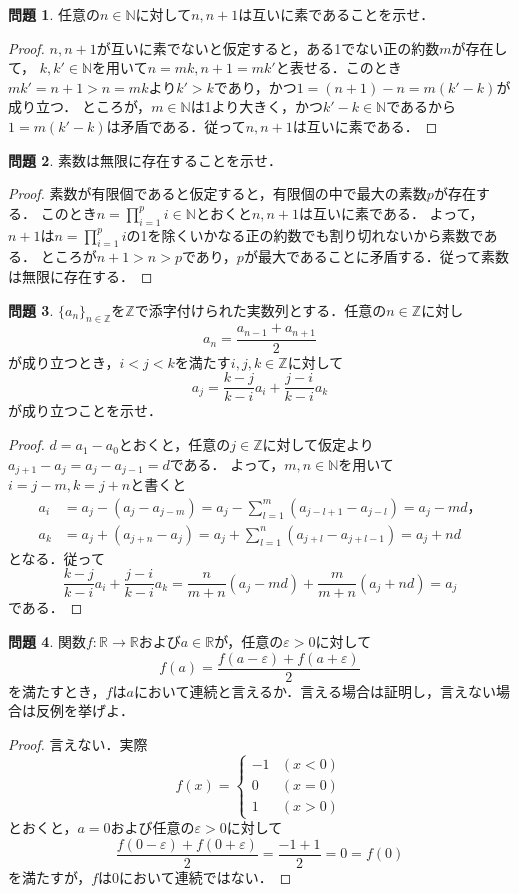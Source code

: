 \documentclass{jsarticle}
\theoremstyle{definition}
\newtheorem{qst}{問題}
\begin{document}
\begin{qst}
任意の$n\in\mathbb{N}$に対して$n,n+1$は互いに素であることを示せ．
\end{qst}
\begin{proof}
$n,n+1$が互いに素でないと仮定すると，ある1でない正の約数$m$が存在して，
$k,k'\in\mathbb{N}$を用いて$n=mk,n+1=mk'$と表せる．このとき
$mk'=n+1>n=mk$より$k'>k$であり，かつ$1=(n+1)-n=m(k'-k)$が成り立つ．
ところが，$m\in\mathbb{N}$は1より大きく，かつ$k'-k\in\mathbb{N}$であるから
$1=m(k'-k)$は矛盾である．従って$n,n+1$は互いに素である．
\end{proof}

\begin{qst}
素数は無限に存在することを示せ．
\end{qst}
\begin{proof}
素数が有限個であると仮定すると，有限個の中で最大の素数$p$が存在する．
このとき$n=\prod_{i=1}^pi\in\mathbb{N}$とおくと$n,n+1$は互いに素である．
よって，$n+1$は$n=\prod_{i=1}^pi$の1を除くいかなる正の約数でも割り切れないから素数である．
ところが$n+1>n>p$であり，$p$が最大であることに矛盾する．従って素数は無限に存在する．
\end{proof}

\begin{qst}
$\{a_n\}_{n\in\mathbb{Z}}$を$\mathbb{Z}$で添字付けられた実数列とする．任意の$n\in\mathbb{Z}$に対し
\[ a_n=\frac{a_{n-1}+a_{n+1}}{2} \]
が成り立つとき，$i<j<k$を満たす$i,j,k\in\mathbb{Z}$に対して
\[ a_j=\frac{k-j}{k-i}a_i+\frac{j-i}{k-i}a_k \]
が成り立つことを示せ．
\end{qst}
\begin{proof}
$d=a_1-a_0$とおくと，任意の$j\in\mathbb{Z}$に対して仮定より$a_{j+1}-a_j=a_j-a_{j-1}=d$である．
よって，$m,n\in\mathbb{N}$を用いて$i=j-m,k=j+n$と書くと
\begin{align*}
a_i&=a_j-(a_j-a_{j-m})=a_j-\sum_{l=1}^m(a_{j-l+1}-a_{j-l})=a_j-md，\\
a_k&=a_j+(a_{j+n}-a_j)=a_j+\sum_{l=1}^n(a_{j+l}-a_{j+l-1})=a_j+nd
\end{align*}
となる．従って
\[
\frac{k-j}{k-i}a_i+\frac{j-i}{k-i}a_k=\frac{n}{m+n}(a_j-md)+\frac{m}{m+n}(a_j+nd)=a_j
\]
である．
\end{proof}

\begin{qst}
関数$f\colon\mathbb{R}\to\mathbb{R}$および$a\in\mathbb{R}$が，任意の$\varepsilon>0$に対して
\[ f(a)=\frac{f(a-\varepsilon)+f(a+\varepsilon)}{2} \]
を満たすとき，$f$は$a$において連続と言えるか．言える場合は証明し，言えない場合は反例を挙げよ．
\end{qst}
\begin{proof}
言えない．実際
\[ f(x)=\begin{cases}-1 & (x<0) \\ 0 & (x=0) \\ 1 & (x>0)\end{cases} \]
とおくと，$a=0$および任意の$\varepsilon>0$に対して
\[ \frac{f(0-\varepsilon)+f(0+\varepsilon)}{2}=\frac{-1+1}{2}=0=f(0) \]
を満たすが，$f$は0において連続ではない．
\end{proof}
\end{document}

